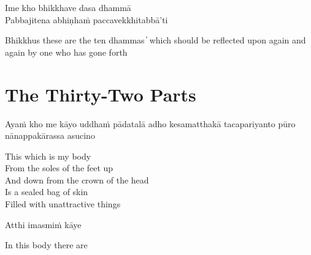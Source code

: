 Ime kho bhikkhave dasa dhammā\\
Pabbajitena abhiṇhaṁ paccavekkhitabbā'ti

\begin{english}
  Bhikkhus these are the ten dhammas  ̓  which should be reflected upon again and again by one who has gone forth
\end{english}


\clearpage

\section{The Thirty-Two Parts}

\begin{leader}
\end{leader}

Ayaṁ kho me kāyo uddhaṁ pādatalā adho kesamatthakā tacapariyanto pūro nānappakārassa asucino

\begin{english}
  This which is my body\\
  From the soles of the feet up\\
  And down from the crown of the head\\
  Is a sealed bag of skin\\
  Filled with unattractive things
\end{english}

Atthi imasmiṁ kāye

\begin{english}
  In this body there are
\end{english}


